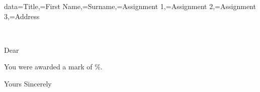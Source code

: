 \documentclass{letter}
\begin{document}
\begin{DTLenvforeach*}{data}{\Title=Title,\FirstName=First Name,\Surname=Surname,\AssignmentI=Assignment 1,\AssignmentII=Assignment 2,\AssignmentIII=Assignment 3,\Address=Address}
\begin{letter}{\Title\space\FirstName\space\Surname\\\Address}
\opening{Dear \Title~\Surname}

\DTLmeanforall{\Score}{\AssignmentI,\AssignmentII,\AssignmentIII}
\DTLclip{\Score}{\Score}%
You were awarded a mark of \Score\%.

\closing{Yours Sincerely}
\end{letter}

\end{DTLenvforeach*}
\end{document}

